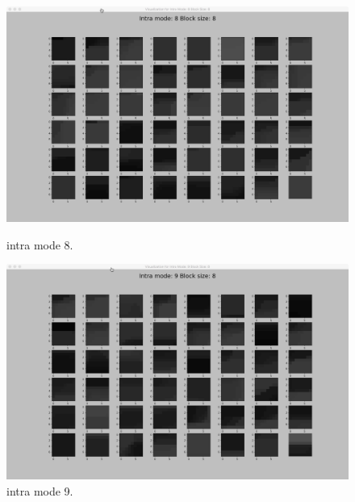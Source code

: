 \begin{figure}[H]
    \begin{minipage}{0.49\textwidth}
        \includegraphics[width=\linewidth]{Figures/visu-size8x8/8-8}
        \caption[Intra mode 8]{intra mode 8.}
        \label{fig:size8_mode8}
    \end{minipage}
    \hspace{\fill} %
    \begin{minipage}{0.49\textwidth}
        \includegraphics[width=\linewidth]{Figures/visu-size8x8/8-9}
        \caption[Intra mode 9]{intra mode 9.}
        \label{fig:size8_mode9}
    \end{minipage}
\end{figure}

